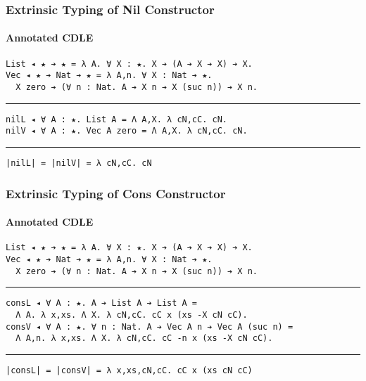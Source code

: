 \documentclass[mathserif,usenames,dvipsnames]{beamer}
\begin{document}
\begin{frame}[fragile]
\frametitle{Extrinsic Typing of Nil Constructor}
\framesubtitle{Annotated CDLE}

\begin{verbatim}
List ◂ ★ ➔ ★ = λ A. ∀ X : ★. X ➔ (A ➔ X ➔ X) ➔ X.
Vec ◂ ★ ➔ Nat ➔ ★ = λ A,n. ∀ X : Nat ➔ ★.
  X zero ➔ (∀ n : Nat. A ➔ X n ➔ X (suc n)) ➔ X n.
\end{verbatim}

\noindent\rule{\textwidth}{1pt}

\begin{verbatim}
nilL ◂ ∀ A : ★. List A = Λ A,X. λ cN,cC. cN.
nilV ◂ ∀ A : ★. Vec A zero = Λ A,X. λ cN,cC. cN.
\end{verbatim}

\noindent\rule{\textwidth}{1pt}

\begin{verbatim}
|nilL| = |nilV| = λ cN,cC. cN
\end{verbatim}

\end{frame}

\begin{frame}[fragile]
\frametitle{Extrinsic Typing of Cons Constructor}
\framesubtitle{Annotated CDLE}

\begin{verbatim}
List ◂ ★ ➔ ★ = λ A. ∀ X : ★. X ➔ (A ➔ X ➔ X) ➔ X.
Vec ◂ ★ ➔ Nat ➔ ★ = λ A,n. ∀ X : Nat ➔ ★.
  X zero ➔ (∀ n : Nat. A ➔ X n ➔ X (suc n)) ➔ X n.
\end{verbatim}

\noindent\rule{\textwidth}{1pt}

\begin{verbatim}
consL ◂ ∀ A : ★. A ➔ List A ➔ List A =
  Λ A. λ x,xs. Λ X. λ cN,cC. cC x (xs -X cN cC).
consV ◂ ∀ A : ★. ∀ n : Nat. A ➔ Vec A n ➔ Vec A (suc n) =
  Λ A,n. λ x,xs. Λ X. λ cN,cC. cC -n x (xs -X cN cC).
\end{verbatim}

\noindent\rule{\textwidth}{1pt}

\begin{verbatim}
|consL| = |consV| = λ x,xs,cN,cC. cC x (xs cN cC)
\end{verbatim}

\end{frame}
\end{document}
